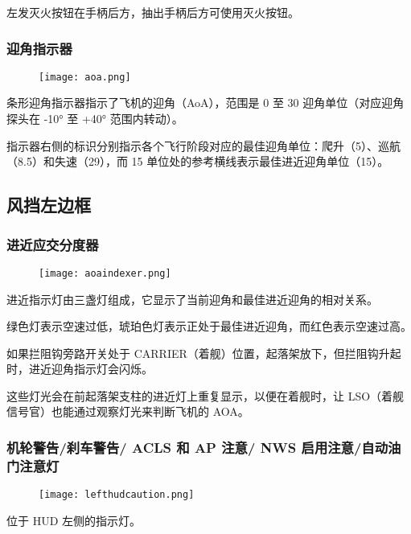 左发灭火按钮在手柄后方，抽出手柄后方可使用灭火按钮。

\subsubsection{迎角指示器}

\begin{figure}[htb]
	\centering
	\texttt{[image: aoa.png]}
\end{figure}
条形迎角指示器指示了飞机的迎角（AoA），范围是 0 至 30 迎角单位（对应迎角探头在 -10° 至 +40° 范围内转动）。

指示器右侧的标识分别指示各个飞行阶段对应的最佳迎角单位：爬升（5）、巡航（8.5）和失速（29），而 15 单位处的参考横线表示最佳进近迎角单位（15）。

\subsection{风挡左边框}

\subsubsection{进近应交分度器}

\begin{figure}[htb]
	\centering
	\texttt{[image: aoaindexer.png]}
\end{figure}
进近指示灯由三盏灯组成，它显示了当前迎角和最佳进近迎角的相对关系。

绿色灯表示空速过低，琥珀色灯表示正处于最佳进近迎角，而红色表示空速过高。

如果拦阻钩旁路开关处于 CARRIER（着舰）位置，起落架放下，但拦阻钩升起时，进近迎角指示灯会闪烁。

这些灯光会在前起落架支柱的进近灯上重复显示，以便在着舰时，让 LSO（着舰信号官）也能通过观察灯光来判断飞机的 AOA。

\subsubsection{机轮警告/刹车警告/ ACLS 和 AP 注意/ NWS 启用注意/自动油门注意灯}

\begin{figure}[htb]
	\centering
	\texttt{[image: lefthudcaution.png]}
\end{figure}
位于 HUD 左侧的指示灯。

